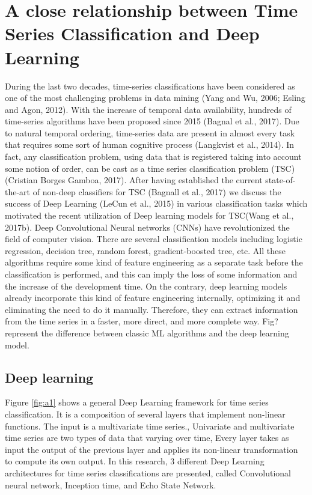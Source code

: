 \documentclass[review]{elsarticle}
\begin{document}
\section{A close relationship between Time Series Classification and Deep Learning }

During the last two decades, time-series classifications have been considered as one of the most challenging problems in data mining (Yang and Wu, 2006; Esling and Agon, 2012). With the increase of temporal data availability, hundreds of time-series algorithms have been proposed since 2015 (Bagnal et al., 2017). Due to natural temporal ordering, time-series data are present in almost every task that requires some sort of human cognitive process (Langkvist et al., 2014). In fact, any classification problem, using data that is registered taking into account some notion of order, can be cast as a time series classification problem (TSC) (Cristian Borges Gamboa, 2017). After having established the current state-of-the-art of non-deep classifiers for TSC (Bagnall et al., 2017) we discuss the success of Deep Learning (LeCun et al., 2015) in various classification tasks which motivated the recent utilization of Deep learning models for TSC(Wang et al., 2017b). Deep Convolutional Neural networks (CNNs) have revolutionized the field of computer vision. There are several classification models including logistic regression, decision tree, random forest, gradient-boosted tree, etc. All these algorithms require some kind of feature engineering as a separate task before the classification is performed, and this can imply the loss of some information and the increase of the development time.  On the contrary, deep learning models already incorporate this kind of feature engineering internally, optimizing it and eliminating the need to do it manually. Therefore, they can extract information from the time series in a faster, more direct, and more complete way. Fig? represent the difference between classic ML algorithms and the deep learning model. 


\subsection{Deep learning}

Figure \ref{fig:a1} shows a general Deep Learning framework for time series classification. It is a composition of several layers that implement non-linear functions. The input is a multivariate time series., Univariate and multivariate time series are two types of data that varying over time, Every layer takes as input the output of the previous layer and applies its non-linear transformation to compute its own output.
In this research, 3 different Deep Learning architectures for time series classifications are presented, called Convolutional neural network, Inception time, and Echo State Network. 
\end{document}
